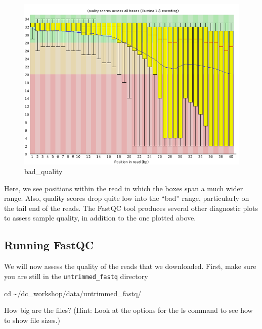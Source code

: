 \documentclass[
  letterpaper,
  DIV=11,
  numbers=noendperiod]{scrreprt}
\newenvironment{Shaded}{\begin{snugshade}}{\end{snugshade}}
\newcommand{\BuiltInTok}[1]{\textcolor[rgb]{0.00,0.23,0.31}{#1}}
\newcommand{\NormalTok}[1]{\textcolor[rgb]{0.00,0.23,0.31}{#1}}
\begin{document}
\begin{figure}

{\centering \includegraphics{images/fastqc-bad.png}

}

\caption{bad\_quality}

\end{figure}

Here, we see positions within the read in which the boxes span a much
wider range. Also, quality scores drop quite low into the ``bad'' range,
particularly on the tail end of the reads. The FastQC tool produces
several other diagnostic plots to assess sample quality, in addition to
the one plotted above.

\hypertarget{running-fastqc}{%
\subsection{Running FastQC}\label{running-fastqc}}

We will now assess the quality of the reads that we downloaded. First,
make sure you are still in the \texttt{untrimmed\_fastq} directory

\begin{Shaded}
\begin{Highlighting}[]
\BuiltInTok{cd}\NormalTok{ \textasciitilde{}/dc\_workshop/data/untrimmed\_fastq/}
\end{Highlighting}
\end{Shaded}

\begin{tcolorbox}[enhanced jigsaw, toptitle=1mm, breakable, bottomrule=.15mm, colback=white, toprule=.15mm, opacityback=0, bottomtitle=1mm, coltitle=black, opacitybacktitle=0.6, rightrule=.15mm, colframe=quarto-callout-caution-color-frame, titlerule=0mm, colbacktitle=quarto-callout-caution-color!10!white, title={Exercise}, left=2mm, leftrule=.75mm, arc=.35mm]

How big are the files? (Hint: Look at the options for the ls command to
see how to show file sizes.)

\end{tcolorbox}
\end{document}
